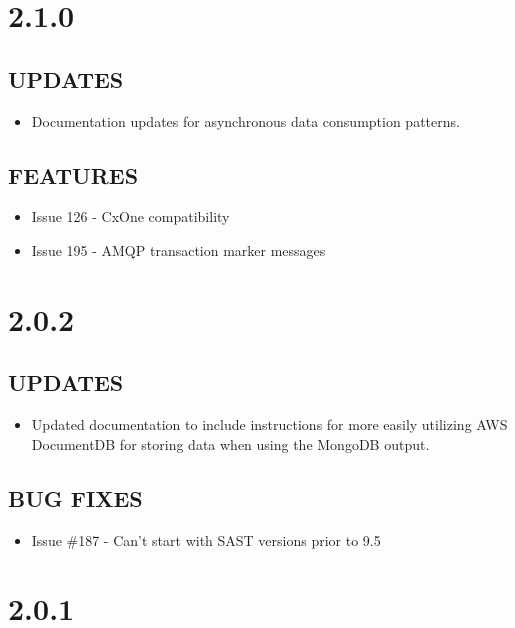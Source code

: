 \section{2.1.0}

\subsection*{UPDATES}
\begin{itemize}
    \item Documentation updates for asynchronous data consumption patterns.
\end{itemize}

\subsection*{FEATURES}
    \begin{itemize}
        \item Issue 126 - CxOne compatibility
        \item Issue 195 - AMQP transaction marker messages
    \end{itemize}

\section{2.0.2}

\subsection*{UPDATES}
\begin{itemize}
    \item Updated documentation to include instructions for more easily 
    utilizing AWS DocumentDB for storing data when using the MongoDB
    output.
\end{itemize}

\subsection*{BUG FIXES}
\begin{itemize}
    \item Issue \#187 - Can't start with SAST versions prior to 9.5
\end{itemize}

\section{2.0.1}

